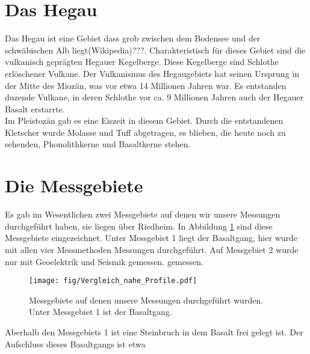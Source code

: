 
\section{Das Hegau}
Das Hegau ist eine Gebiet dass grob zwischen dem Bodensee und der schwäbischen Alb liegt(Wikipedia)???. Charakteristisch für dieses Gebiet sind die vulkanisch 
geprägten Hegauer Kegelberge. Diese Kegelberge sind Schlothe erlöschener Vulkane. Der Vulkanismus des Hegaugebiets hat seinen Ursprung in der Mitte des Miozän, 
was vor etwa 14 Millionen Jahren war. Es entstanden duzende Vulkane, in deren Schlothe vor ca. 9 Millionen Jahren auch der Hegauer Basalt erstarrte.\\
Im Pleistozän gab es eine Eiszeit in diesem Gebiet. Durch die entstandenen Kletscher wurde Molasse und Tuff abgetragen, es blieben, die heute noch zu sehenden, 
Phonolithkerne und Basaltkerne stehen. 






\section{Die Messgebiete}


Es gab im Wesentlichen zwei Messgebiete auf denen wir unsere Messungen durchgeführt haben, sie liegen über Riedheim. In Abbildung \ref{abb:Messgebiete} sind diese Messgebiete 
eingezeichnet. Unter Messgebiet 1 liegt der Basaltgang, hier wurde mit allen vier Messmethoden Messungen durchgeführt. 
Auf Messgebiet 2 wurde nur mit Geoelektrik und Seismik gemessen.
gemessen.
\begin{figure}
 \centering
 \texttt{[image: fig/Vergleich\_nahe\_Profile.pdf]}
 \caption[Messgebiete]{Messgebiete auf denen unsere Messungen durchgeführt wurden. Unter Messgebiet 1 ist der Basaltgang.}
 \label{abb:Messgebiete}
\end{figure}

Aberhalb den Messgebiets 1 ist eine Steinbruch in dem Basalt frei gelegt ist. Der Aufschluss dieses Basaltgangs ist etwa 